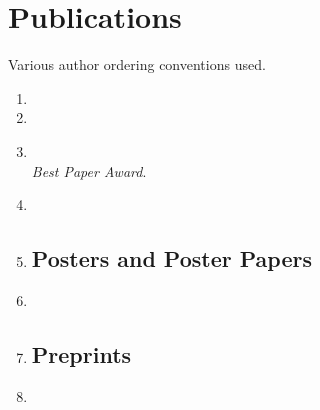 \documentclass[10pt]{article}
\begin{document}
\section*{Publications}

Various author ordering conventions used. 

\begin{enumerate}
  
\subsection*{Journal and Conference Papers}

\item {}

\item {}

\item {}\\
\textit{Best Paper Award}.

\item {}

\item {}

\subsection*{Posters and Poster Papers}

\item {}

\item {}

\subsection*{Preprints}

\item {}

\end{enumerate}
\end{document}
